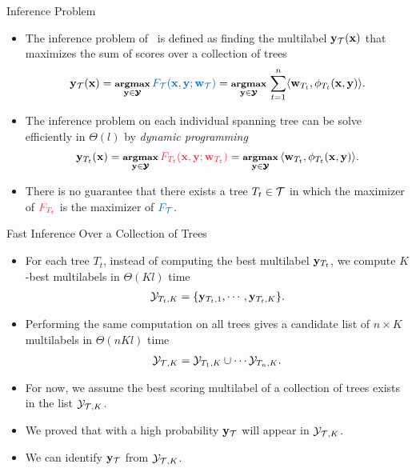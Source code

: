 \documentclass[first=dgreen,second=purple,logo=yellowexc]{aaltoslides}
\begin{document}
\begin{frame}{Inference Problem}
	\begin{itemize}
		\item The inference problem of \rta\ is defined as finding the multilabel $\mathbf {y}_{\mathcal{T}}(\mathbf {x})$ that maximizes the sum of scores over a collection of trees
		\begin{align*}\footnotesize
			\vy_{\Tcal}(\vx) = \underset{\vy\in\vYcal}{\argmax}\,{\color{aaltoblue}F_{\Tcal}(\vx,\vy;\vw_{\Tcal})} = \underset{\vy\in\vYcal}{\argmax}\,\sum_{t=1}^{n}\ip{\vw_{T_t}}{\phi_{T_t}(\vx,\vy)}.
		\end{align*}
		\item The inference problem on each individual spanning tree can be solve efficiently in $\Theta(l)$ by \textit{dynamic programming}
		\begin{align*}\footnotesize
			\vy_{T_t}(\vx) = \underset{\vy\in\vYcal}{\argmax}\,{\color{aaltored}F_{T_t}(\vx,\vy;\vw_{T_t})}= \underset{\vy\in\vYcal}{\argmax}\,\ip{\vw_{T_t}}{\phi_{T_t}(\vx,\vy)}.
		\end{align*}
		\item There is no guarantee that there exists a tree $T_t\in\mathcal{T}$ in which the maximizer of ${\color{aaltored}F_{T_t}}$ is the maximizer of ${\color{aaltoblue}F_{\Tcal}}$.
	\end{itemize}
\end{frame}




%
\begin{frame}[allowframebreaks]{Fast Inference Over a Collection of Trees}
	\begin{itemize}
		\item For each tree $T_t$, instead of computing the best multilabel $\mathbf {y}_{T_t}$, we compute $K$-best multilabels in $\Theta(Kl)$ time
		\begin{align*}\footnotesize
			\mathcal{Y}_{T_t,K} = \{\mathbf {y}_{T_t,1},\cdots,\mathbf {y}_{T_t,K}\}.
		\end{align*}
		\item Performing the same computation on all trees gives a candidate list of $n\times K$ multilabels in $\Theta(nKl)$ time
		\begin{align*}\footnotesize
			\mathcal{Y}_{\mathcal{T},K}=\mathcal{Y}_{T_1,K}\cup\cdots\mathcal{Y}_{T_n,K}.
		\end{align*}
		\item For now, we assume the best scoring multilabel of a collection of trees exists in the list $\mathcal{Y}_{\mathcal{T},K}$. 
		\item We proved that with a high probability $\mathbf {y}_{\mathcal{T}}$ will appear in $\mathcal{Y}_{\mathcal{T},K}$.
		\item We can identify $\mathbf {y}_{\mathcal{T}}$ from $\mathcal{Y}_{\mathcal{T},K}$.
	\end{itemize}
\end{frame}
\end{document}
